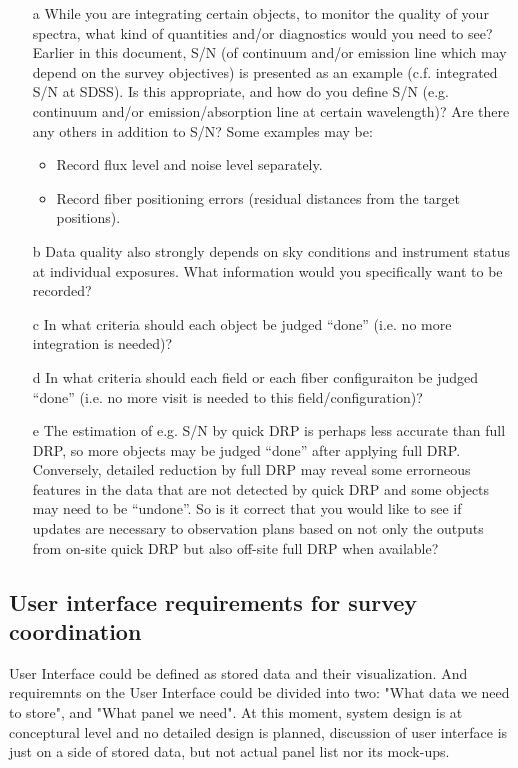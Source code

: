 \documentclass[a4paper,notitlepage]{article}
\newcommand{\coll}[1]{\textcolor{ccoll}{#1}}
\begin{document}
\begin{enumerate}
 \item[\coll{a}] While you are integrating certain objects, to monitor the
      quality of your spectra, what kind of quantities and/or
      diagnostics would you need to see? Earlier in this document,
      S/N (of continuum and/or emission line which may depend on the
      survey objectives) is presented as an example (c.f. integrated
      S/N at SDSS). Is this appropriate, and how do you define S/N 
      (e.g. continuum and/or emission/absorption line at certain wavelength)? 
      Are there any others in
      addition to S/N? Some examples may be:
      \begin{itemize}
       \item Record flux level and noise level separately.
       \item Record fiber positioning errors (residual distances
         from the target positions).
      \end{itemize}
 \item[\coll{b}] Data quality also strongly depends on sky conditions and
      instrument status at individual exposures. What information
      would you specifically want to be recorded?
 \item[\coll{c}] In what criteria should each object be judged ``done''
      (i.e. no more integration is needed)?
 \item[\coll{d}] In what criteria should each field or each fiber configuraiton
      be judged ``done'' (i.e. no more visit is needed to this
      field/configuration)?
 \item[\coll{e}] The estimation of e.g. S/N by quick DRP is perhaps less
      accurate than full DRP, so more objects may be judged ``done''
      after applying full DRP. Conversely, detailed reduction by
      full DRP may reveal some errorneous features in the data that
      are not detected by quick DRP and some objects may need to be
      ``undone''. So is it correct that you would like to see if
      updates are necessary to observation plans based on not only
      the outputs from on-site quick DRP but also off-site full DRP
      when available?
\end{enumerate}

\subsection{User interface requirements for survey coordination}

User Interface could be defined as stored data and their
visualization. And requiremnts on the User Interface could be divided
into two: "What data we need to store", and "What panel we need".  At
this moment, system design is at conceptural level and no detailed
design is planned, discussion of user interface is just on a side of
stored data, but not actual panel list nor its mock-ups.
\end{document}
